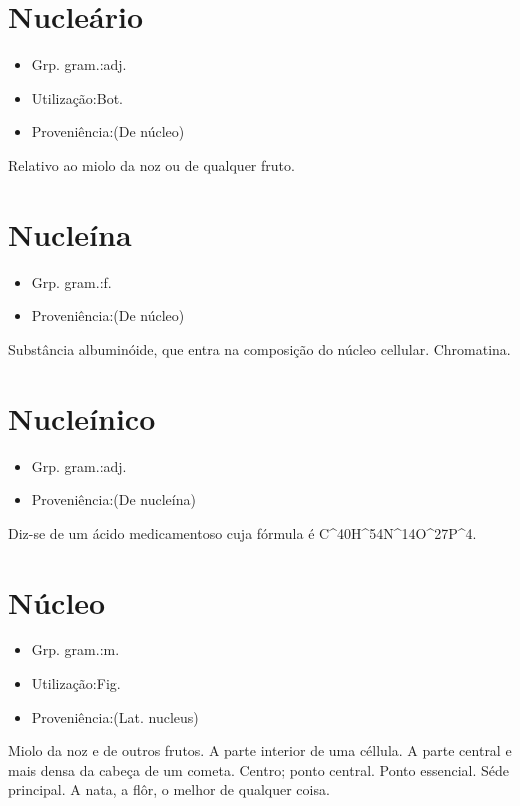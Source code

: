 \section{Nucleário}
\begin{itemize}
\item {Grp. gram.:adj.}
\end{itemize}
\begin{itemize}
\item {Utilização:Bot.}
\end{itemize}
\begin{itemize}
\item {Proveniência:(De \textunderscore núcleo\textunderscore )}
\end{itemize}
Relativo ao miolo da noz ou de qualquer fruto.
\section{Nucleína}
\begin{itemize}
\item {Grp. gram.:f.}
\end{itemize}
\begin{itemize}
\item {Proveniência:(De \textunderscore núcleo\textunderscore )}
\end{itemize}
Substância albuminóide, que entra na composição do núcleo cellular.
Chromatina.
\section{Nucleínico}
\begin{itemize}
\item {Grp. gram.:adj.}
\end{itemize}
\begin{itemize}
\item {Proveniência:(De \textunderscore nucleína\textunderscore )}
\end{itemize}
Diz-se de um ácido medicamentoso cuja fórmula é C^{40}H^{54}N^{14}O^{27}P^4.
\section{Núcleo}
\begin{itemize}
\item {Grp. gram.:m.}
\end{itemize}
\begin{itemize}
\item {Utilização:Fig.}
\end{itemize}
\begin{itemize}
\item {Proveniência:(Lat. \textunderscore nucleus\textunderscore )}
\end{itemize}
Miolo da noz e de outros frutos.
A parte interior de uma céllula.
A parte central e mais densa da cabeça de um cometa.
Centro; ponto central.
Ponto essencial.
Séde principal.
A nata, a flôr, o melhor de qualquer coisa.
